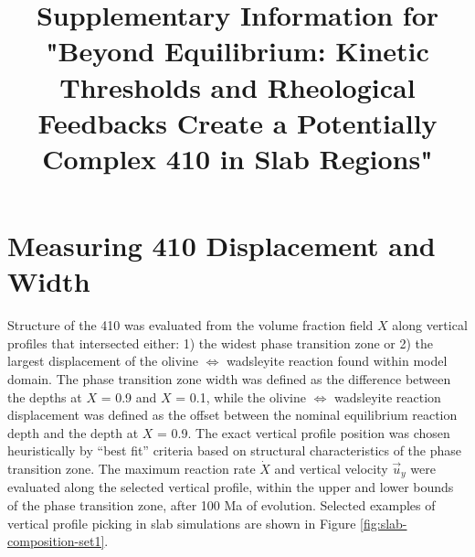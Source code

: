\documentclass[draft,linenumbers]{agujournal2019}
\let\oldtitle\title
\renewcommand{\title}[1]{\oldtitle{#1}\thispagestyle{front}}
\begin{document}
\title{Supplementary Information for "Beyond Equilibrium: Kinetic
Thresholds and Rheological Feedbacks Create a Potentially Complex 410 in
Slab Regions"}




\clearpage

\section*{Measuring 410 Displacement and
Width}\label{sec:measuring-displacement-width}

Structure of the 410 was evaluated from the volume fraction field \(X\)
along vertical profiles that intersected either: 1) the widest phase
transition zone or 2) the largest displacement of the olivine
\(\Leftrightarrow\) wadsleyite reaction found within model domain. The
phase transition zone width was defined as the difference between the
depths at \(X\) = 0.9 and \(X\) = 0.1, while the olivine
\(\Leftrightarrow\) wadsleyite reaction displacement was defined as the
offset between the nominal equilibrium reaction depth and the depth at
\(X\) = 0.9. The exact vertical profile position was chosen
heuristically by ``best fit'' criteria based on structural
characteristics of the phase transition zone. The maximum reaction rate
\(\dot{X}\) and vertical velocity \(\vec{u}_y\) were evaluated along the
selected vertical profile, within the upper and lower bounds of the
phase transition zone, after 100 Ma of evolution. Selected examples of
vertical profile picking in slab simulations are shown in Figure
\ref{fig:slab-composition-set1}.

\clearpage
\end{document}
